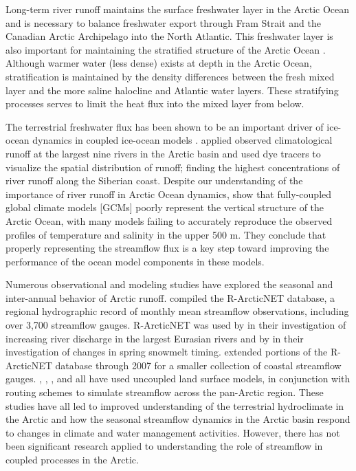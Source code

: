 \documentclass[jgrga, draft]{agutex}
\begin{document}
\begin{article}
Long-term river runoff maintains the surface freshwater layer in the Arctic Ocean and is necessary to balance freshwater export through Fram Strait and the Canadian Arctic Archipelago into the North Atlantic.
This freshwater layer is also important for maintaining the stratified structure of the Arctic Ocean \citep{Nummelin_2015}.
Although warmer water (less dense) exists at depth in the Arctic Ocean, stratification is maintained by the density differences between the fresh mixed layer and the more saline halocline and Atlantic water layers.
These stratifying processes serves to limit the heat flux into the mixed layer from below.

The terrestrial freshwater flux has been shown to be an important driver of ice-ocean dynamics in coupled ice-ocean models \citep[e.g.][]{Lique_2015}.
\citet{Newton_2008} applied observed climatological runoff at the largest nine rivers in the Arctic basin and used dye tracers to visualize the spatial distribution of runoff; finding the highest concentrations of river runoff along the Siberian coast.
Despite our understanding of the importance of river runoff in Arctic Ocean dynamics, \citet{Nummelin_2015} show that fully-coupled global climate models [GCMs] poorly represent the vertical structure of the Arctic Ocean, with many models failing to accurately reproduce the observed profiles of temperature and salinity in the upper 500 m.
They conclude that properly representing the streamflow flux is a key step toward improving the performance of the ocean model components in these models.

Numerous observational and modeling studies have explored the seasonal and inter-annual behavior of Arctic runoff.
\citet{Lammers_2001} compiled the R-ArcticNET database, a regional hydrographic record of monthly mean streamflow observations, including over 3,700 streamflow gauges.
R-ArcticNET was used by \citet{Shiklomanov_2009} in their investigation of increasing river discharge in the largest Eurasian rivers and by \citet{Tan_2011} in their investigation of changes in spring snowmelt timing.
\citet{Dai_2009} extended portions of the R-ArcticNET database through 2007 for a smaller collection of coastal streamflow gauges.
\citet{Adam_2007}, \citet{Adam_2008}, \citet{Su_2005}, and \citet{Dai_2009} all have used uncoupled land surface models, in conjunction with routing schemes to simulate streamflow across the pan-Arctic region.
These studies have all led to improved understanding of the terrestrial hydroclimate in the Arctic and how the seasonal streamflow dynamics in the Arctic basin respond to changes in climate and water management activities.
However, there has not been significant research applied to understanding the role of streamflow in coupled processes in the Arctic.


\end{article}
\end{document}
